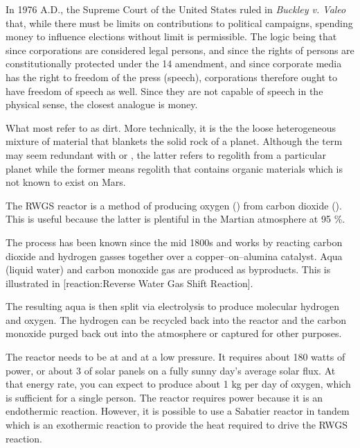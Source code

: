 In 1976 A.D., the Supreme Court of the United States ruled in {\it Buckley v. Valeo} that, while there must be limits on contributions to political campaigns, spending money to influence elections without limit is permissible. The logic being that since corporations are considered legal persons, and since the rights of persons are constitutionally protected under the 14 amendment, and since corporate media has the right to freedom of the press (speech), corporations therefore ought to have freedom of speech as well. Since they are not capable of speech in the physical sense, the closest analogue is money.

What most refer to as dirt. More technically, it is the the loose heterogeneous mixture of material that blankets the solid rock of a planet. Although the term may seem redundant with  or , the latter refers to regolith from a particular planet while the former means regolith that contains organic materials which is not known to exist on Mars.

The RWGS reactor is a method of producing oxygen () from carbon dioxide (). This is useful because the latter is plentiful in the Martian atmosphere at 95 \%.

\startformula
{}
\stopformula

The process has been known since the mid 1800s and works by reacting carbon dioxide and hydrogen gasses together over a copper--on--alumina catalyst. Aqua (liquid water) and carbon monoxide gas are produced as byproducts. This is illustrated in [reaction:Reverse Water Gas Shift Reaction].

The resulting aqua is then split via electrolysis to produce molecular hydrogen and oxygen. The hydrogen can be recycled back into the reactor and the carbon monoxide purged back out into the atmosphere or captured for other purposes.

The reactor needs to be at  and at a low pressure. It requires about 180 watts of power, or about 3  of solar panels on a fully sunny day's average solar flux. At that energy rate, you can expect to produce about 1 kg per day of oxygen, which is sufficient for a single person. The reactor requires power because it is an endothermic reaction. However, it is possible to use a Sabatier reactor in tandem which is an exothermic reaction to provide the heat required to drive the RWGS reaction.

